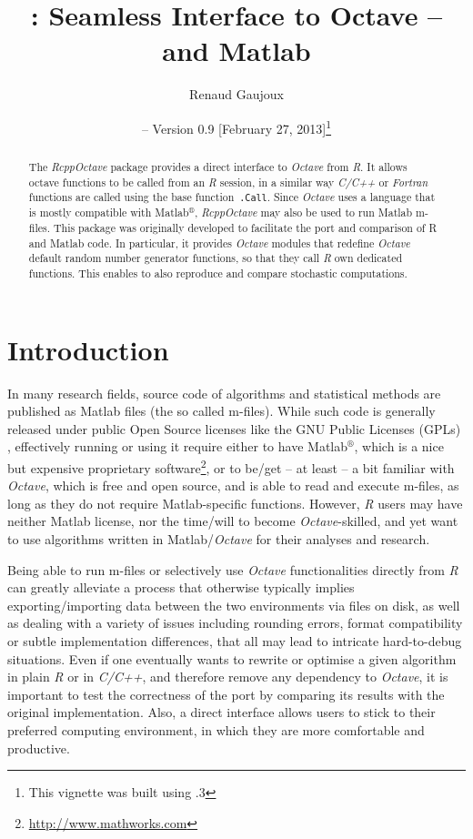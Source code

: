 \documentclass[english,10pt,a4paper]{article}\usepackage{graphicx, color}
\author{Renaud Gaujoux}
\title{\pkgname{RcppOctave}: Seamless Interface to Octave -- and Matlab}
\date{\Rpkg{RcppOctave} -- Version 0.9
[February 27, 2013]\footnote{This vignette was built using \octave
3.6.3}}
\newcommand{\matlab}{Matlab$^\circledR$\xspace}
\let\proglang=\textit
\let\code=\texttt
\newcommand{\pkgname}[1]{\textit{#1}\xspace}
\newcommand{\Rpkg}[1]{\pkgname{#1} package\xspace}
\newcommand{\R}{\proglang{R}\xspace}
\newcommand{\octave}{\proglang{Octave}\xspace}
\begin{document}
\maketitle

\begin{abstract}
The \Rpkg{RcppOctave} provides a direct interface to \octave from
\R.
It allows \\octave functions to be called from an \R session,
in a similar way \proglang{C/C++} or \proglang{Fortran} functions are called using the base function~\code{.Call}.
Since \octave uses a language that is mostly compatible with \matlab,
\pkgname{RcppOctave} may also be used to run Matlab m-files.
This package was originally developed to facilitate the port and comparison of R
and Matlab code.
In particular, it provides \octave modules that redefine
\octave default random number generator functions, so that they call
\proglang{R} own dedicated functions.
This enables to also reproduce and compare stochastic computations.
\end{abstract}

\noindent\hrulefill
\tableofcontents
\noindent\hrulefill

\section{Introduction}

In many research fields, source code of algorithms and statistical methods are
published as Matlab files (the so called m-files).
While such code is generally released under public Open Source licenses like the
GNU Public Licenses (GPLs) \cite{gnuGPL}, effectively running or using it
require either to have \matlab, which is a nice but expensive proprietary
software\footnote{\url{http://www.mathworks.com}}, or to be/get -- at least -- a bit familiar with \octave \cite{Eaton2002}, which is free and open source, and is able to read and execute m-files, as long as they do not require Matlab-specific functions.
However, \proglang{R} users may have neither Matlab license, nor the
time/will to become \octave-skilled, and yet want to use algorithms written in
Matlab/\octave for their analyses and research.

Being able to run m-files or selectively use \octave functionalities
directly from \proglang{R} can greatly alleviate a process that otherwise
typically implies exporting/importing data between the two environments via
files on disk, as well as dealing with a variety of issues including
rounding errors, format compatibility or subtle implementation differences,
that all may lead to intricate hard-to-debug situations.
Even if one eventually wants to rewrite or optimise a given algorithm in plain
\proglang{R} or in \proglang{C/C++}, and therefore remove any dependency to
\octave, it is important to test the correctness of the port by
comparing its results with the original implementation.
Also, a direct interface allows users to stick to their preferred computing
environment, in which they are more comfortable and productive.
\end{document}
